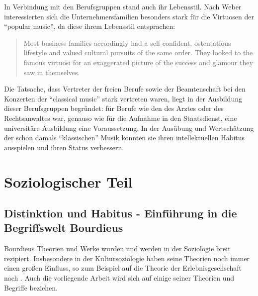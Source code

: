 \documentclass[a4paper, german, oneside]{scrbook}
\begin{document}
In Verbindung mit den Berufsgruppen stand auch ihr Lebensstil. Nach Weber interessierten sich die Unternehmersfamilien besonders stark für die Virtuosen der \enquote{popular music}, da diese ihrem Lebensstil entsprachen: \blockquote[{\cite[39]{weber_music_2004}}]{Most business families accordingly had a self-confident, ostentatious lifestyle and valued cultural pursuits of the same order. They looked to the famous virtuosi for an exaggerated picture of the success and glamour they saw in themselves.}

Die Tatsache, dass Vertreter der freien Berufe sowie der Beamtenschaft bei den Konzerten der \enquote{classical music} stark vertreten waren, liegt in der Ausbildung dieser Berufsgruppen begründet: für Berufe wie den des Arztes oder des Rechtsanwaltes war, genauso wie für die Aufnahme in den Staatsdienst, eine universitäre Ausbildung eine Voraussetzung. In der Ausübung und Wertschätzung der schon damals \enquote{klassischen} Musik konnten sie ihren intellektuellen Habitus ausspielen und ihren Status verbessern. \parencite[vgl.][67]{weber_music_2004}






\part{Soziologischer Teil}
\chapter{Distinktion und Habitus - Einführung in die Begriffswelt Bourdieus}
Bourdieus Theorien und Werke wurden und werden in der Soziologie breit rezipiert. Insbesondere in der Kultursoziologie haben seine Theorien noch immer einen großen Einfluss, so zum Beispiel auf die Theorie der Erlebnisgesellschaft nach \cite{schulze_erlebnisgesellschaft:_1993}. Auch die vorliegende Arbeit wird sich auf einige seiner Theorien und Begriffe beziehen. \parencite[vgl.][555]{joas_sozialtheorie:_2004}
\end{document}

